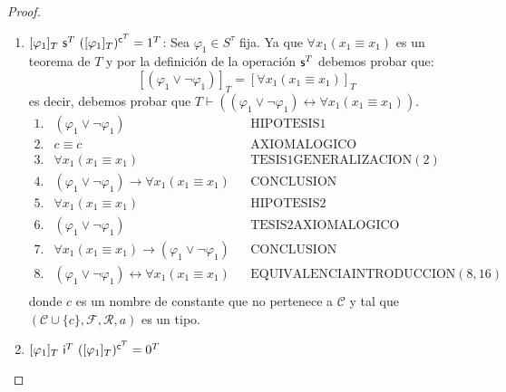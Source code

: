 \begin{proof}
\begin{enumerate}[(1)]
      \item $[\varphi_{1}]_{T} \ \SU^{T} \ ([\varphi_{1}]_{T})^{\mathsf{c}^{T}} = 1^{T}$: Sea $\varphi_{1} \in S^{\tau}$
        fija. Ya que $\forall x_{1} (x_{1} \equiv x_{1})$ es un teorema de $T$ y por la definición de la operación
        $\mathsf{s}^{T}$ debemos probar que:
        \[
          [(\varphi_{1} \vee \lnot\varphi_{1})]_{T} = [\forall x_{1} (x_{1} \equiv x_{1})]_{T}
        \]
        \PN es decir, debemos probar que $T \vdash ((\varphi_{1} \vee \lnot\varphi_{1}) \leftrightarrow \forall x_{1}
        (x_{1} \equiv x_{1}))$.
        \[
          \begin{array}{llll}
            1. & (\varphi_{1} \vee \lnot\varphi_{1}) && \text{HIPOTESIS1} \\
            2. & c \equiv c && \text{AXIOMALOGICO} \\
            3. & \forall x_{1} (x_{1} \equiv x_{1}) && \text{TESIS1GENERALIZACION}(2) \\
            4. & (\varphi_{1} \vee \lnot\varphi_{1}) \rightarrow \forall x_{1} (x_{1} \equiv x_{1}) &&
              \text{CONCLUSION} \\
            5. & \forall x_{1} (x_{1} \equiv x_{1}) && \text{HIPOTESIS2} \\
            6. & (\varphi_{1} \vee \lnot\varphi_{1}) && \text{TESIS2AXIOMALOGICO} \\
            7. & \forall x_{1} (x_{1} \equiv x_{1}) \rightarrow (\varphi_{1} \vee \lnot\varphi_{1}) &&
              \text{CONCLUSION} \\
            8. & (\varphi_{1} \vee \lnot\varphi_{1}) \leftrightarrow \forall x_{1} (x_{1} \equiv x_{1}) &&
              \text{EQUIVALENCIAINTRODUCCION}(8,16) \\
          \end{array}
        \]
        \PN donde $c$ es un nombre de constante que no pertenece a $\mathcal{C}$ y tal que $(\mathcal{C} \cup \{c\},
        \mathcal{F}, \mathcal{R}, a)$ es un tipo.

      \item $[\varphi_{1}]_{T} \ \IN^{T} \ ([\varphi_{1}]_{T})^{\mathsf{c}^{T}} = 0^{T}$


\end{enumerate}
\end{proof}
